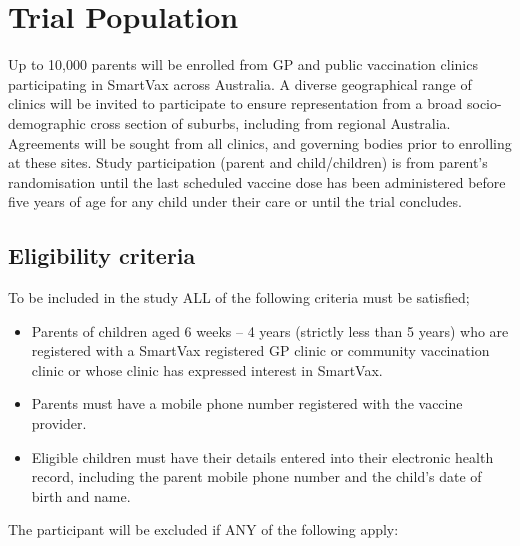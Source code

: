 \documentclass[
  bibliography=totoc]{scrreprt}
\providecommand{\tightlist}{%
  \setlength{\itemsep}{0pt}\setlength{\parskip}{0pt}}
\begin{document}
\hypertarget{trial-population}{%
\chapter{Trial Population}\label{trial-population}}

Up to 10,000 parents will be enrolled from GP and public vaccination clinics participating in SmartVax across Australia.
A diverse geographical range of clinics will be invited to participate to ensure representation from a broad socio-demographic cross section of suburbs, including from regional Australia.
Agreements will be sought from all clinics, and governing bodies prior to enrolling at these sites.
Study participation (parent and child/children) is from parent's randomisation until the last scheduled vaccine dose has been administered before five years of age for any child under their care or until the trial concludes.

\hypertarget{eligibility-criteria}{%
\section{Eligibility criteria}\label{eligibility-criteria}}

To be included in the study ALL of the following criteria must be satisfied;

\begin{itemize}
\tightlist
\item
  Parents of children aged 6 weeks -- 4 years (strictly less than 5 years) who are registered with a SmartVax registered GP clinic or community vaccination clinic or whose clinic has expressed interest in SmartVax.
\item
  Parents must have a mobile phone number registered with the vaccine provider.
\item
  Eligible children must have their details entered into their electronic health record, including the parent mobile phone number and the child's date of birth and name.
\end{itemize}

The participant will be excluded if ANY of the following apply:
\end{document}
